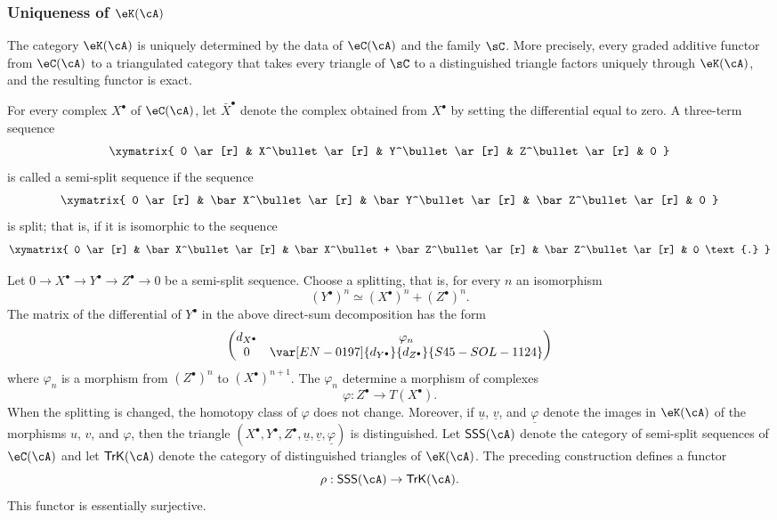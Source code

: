 \subsubsection{Uniqueness of $\eK(\cA)$}\label{VIII:1-2-4}

The category $\eK(\cA)$ is uniquely determined by the data of $\eC(\cA)$
and the family $\sC$. More precisely, every graded additive functor from
$\eC(\cA)$ to a triangulated category that takes every triangle of $\sC$
to a distinguished triangle factors uniquely through $\eK(\cA)$, and the
resulting functor is exact.

For every complex $X^\bullet$ of $\eC(\cA)$, let $\bar X^\bullet$ denote
the complex obtained from $X^\bullet$ by setting the differential equal
to zero. A three-term sequence
\[\xymatrix{
  0 \ar[r]
    & X^\bullet \ar[r]
    & Y^\bullet \ar[r]
    & Z^\bullet \ar[r]
    & 0
}\]
is called a semi-split sequence if the sequence
\[\xymatrix{
  0 \ar[r]
    & \bar X^\bullet \ar[r]
    & \bar Y^\bullet \ar[r]
    & \bar Z^\bullet \ar[r]
    & 0
}\]
is split; that is, if it is isomorphic to the sequence
\[\xymatrix{
  0 \ar[r]
    & \bar X^\bullet \ar[r]
    & \bar X^\bullet + \bar Z^\bullet \ar[r]
    & \bar Z^\bullet \ar[r]
    & 0 \text{.}
}\]

Let $0 \to X^\bullet \to Y^\bullet \to Z^\bullet \to 0$ be a semi-split
sequence. Choose a splitting, that is, for every $n$ an isomorphism
\[
  (Y^\bullet)^n \simeq (X^\bullet)^n + (Z^\bullet)^n \text{.}
\]
The matrix of the differential of $Y^\bullet$ in the above direct-sum
decomposition has the form
\[
  \begin{pmatrix}
    d_{X^\bullet} & \varphi_n \\
    0 & \var[EN-0197]{d_{Y^\bullet}}{d_{Z^\bullet}}{S45-SOL-1124}
  \end{pmatrix}
\]
where $\varphi_n$ is a morphism from $(Z^\bullet)^n$ to
$(X^\bullet)^{n+1}$. The $\varphi_n$ determine a morphism of complexes
\[
  \varphi:Z^\bullet \to T(X^\bullet) \text{.}
\]
When the splitting is changed, the homotopy class of $\varphi$ does not
change. Moreover, if $\underline u$, $\underline v$, and
$\underline\varphi$ denote the images in $\eK(\cA)$ of the morphisms $u$,
$v$, and $\varphi$, then the triangle
$(X^\bullet,Y^\bullet,Z^\bullet,\underline u,\underline v,\underline\varphi)$
is distinguished. Let $\mathsf{SSS}(\cA)$ denote the category of
semi-split sequences of $\eC(\cA)$ and let $\mathsf{TrK}(\cA)$ denote the
category of distinguished triangles of $\eK(\cA)$. The preceding
construction defines a functor
\[
  \rho:\mathsf{SSS}(\cA) \to \mathsf{TrK}(\cA) \text{.}
\]
This functor is essentially surjective.

